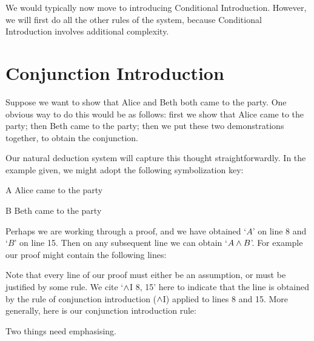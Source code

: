 We would typically now move to introducing Conditional Introduction. However, we will first do all the other rules of the system, because Conditional Introduction involves additional complexity.

\section{Conjunction Introduction}
Suppose we want to show that Alice and Beth both came to the party. One obvious way to do this would be as follows: first we show that Alice came to the party; then Beth came to the party; then we put these two demonstrations together, to obtain the conjunction.

Our natural deduction system will capture this thought straightforwardly. In the example given, we might adopt the following symbolization key:
	\begin{ekey}
		\item[A] Alice came to the party
		\item[B] Beth came to the party
	\end{ekey}
Perhaps we are working through a proof, and we have obtained `$A$' on line 8 and `$B$' on line 15. Then on any subsequent line we can obtain `$A \mathbin{\wedge} B$'. For example our proof might contain the following lines:
\begin{fitchproof}
	\hspace*{1em}
	\hspace*{1em}
	 \hspace*{1em}
\end{fitchproof}
Note that every line of our proof must either be an assumption, or must be justified by some rule. We cite `$\mathbin{\wedge}$I 8, 15' here to indicate that the line is obtained by the rule of conjunction introduction ($\mathbin{\wedge}$I) applied to lines 8 and 15.
More generally, here is our conjunction introduction rule:


Two things need emphasising.

